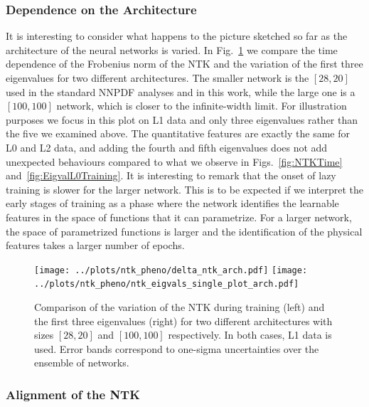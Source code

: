 \FloatBarrier

\subsubsection{Dependence on the Architecture}
\label{sec:DepOnArch}

It is interesting to consider what happens to the picture sketched so far as the architecture 
of the neural networks is varied. In Fig.~\ref{fig:NTKTimeDiffArch}
we compare the time dependence of the Frobenius norm of the NTK and the variation of the first three eigenvalues
for two different architectures. The smaller network is the $[28,20]$ used in the standard NNPDF
analyses and in this work, while the large one is a $[100,100]$ network, which is closer to the infinite-width
limit. For illustration purposes we focus in this plot on L1 data and only three eigenvalues rather than the five
we examined above. The quantitative features are exactly the same for L0 and L2 data, and adding the fourth 
and fifth eigenvalues does not add unexpected behaviours compared to what we observe in Figs.~\ref{fig:NTKTime} 
and~\ref{fig:EigvalL0Training}. It is interesting to remark that the onset of lazy training is slower 
for the larger network. This is to be expected if we interpret the early stages of training as a phase where 
the network identifies the learnable features in the space of functions that it can parametrize. For a 
larger network, the space of parametrized functions is larger and the identification of the physical 
features takes a larger number of epochs. 
\begin{figure}[ht!]
  \centering
  \texttt{[image: ../plots/ntk\_pheno/delta\_ntk\_arch.pdf]}
  \texttt{[image: ../plots/ntk\_pheno/ntk\_eigvals\_single\_plot\_arch.pdf]}
  \caption{Comparison of the variation of the NTK during training (left) and the
  first three eigenvalues (right) for two different architectures with sizes
  $[28,20]$ and $[100,100]$ respectively. In both cases, L1 data is used. Error
  bands correspond to one-sigma uncertainties over the ensemble of networks.}
  \label{fig:NTKTimeDiffArch}
\end{figure}

\FloatBarrier

\subsubsection{Alignment of the NTK}
\label{sec:NTKAlign}

